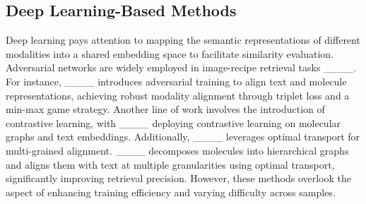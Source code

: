 \subsection{Deep Learning-Based Methods}
Deep learning pays attention to mapping the semantic representations of different modalities into a shared embedding space to facilitate similarity evaluation. Adversarial networks are widely employed in image-recipe retrieval tasks ____. For instance, ____ introduces adversarial training to align text and molecule representations, achieving robust modality alignment through triplet loss and a min-max game strategy. Another line of work involves the introduction of contrastive learning, with ____ deploying contrastive learning on molecular graphs and text embeddings. Additionally, ____ leverages optimal transport for multi-grained alignment. ____ decomposes molecules into hierarchical graphs and aligns them with text at multiple granularities using optimal transport, significantly improving retrieval precision. However, these methods overlook the aspect of enhancing training efficiency and varying difficulty across samples.
